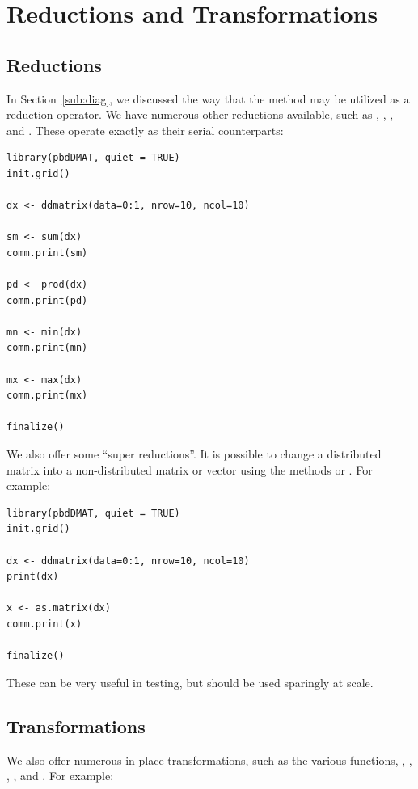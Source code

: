 \section{Reductions and Transformations}

\subsection{Reductions}

In Section~\ref{sub:diag}, we discussed the way that the  method may be utilized as a reduction operator.  We have numerous other reductions available, such as , , , and .  These operate exactly as their serial counterparts:
\begin{lstlisting}[language=rr,title=Reductions]
library(pbdDMAT, quiet = TRUE)
init.grid()

dx <- ddmatrix(data=0:1, nrow=10, ncol=10)

sm <- sum(dx)
comm.print(sm)

pd <- prod(dx)
comm.print(pd)

mn <- min(dx)
comm.print(mn)

mx <- max(dx)
comm.print(mx)

finalize()
\end{lstlisting}

We also offer some ``super reductions''.  It is possible to change a distributed matrix into a non-distributed matrix or vector using the methods  or .  For example:

\begin{lstlisting}[language=rr,title=Super Reductions]
library(pbdDMAT, quiet = TRUE)
init.grid()

dx <- ddmatrix(data=0:1, nrow=10, ncol=10)
print(dx)

x <- as.matrix(dx)
comm.print(x)

finalize()
\end{lstlisting}

These can be very useful in testing, but should be used sparingly at scale.




\subsection{Transformations}

We also offer numerous in-place transformations, such as the various  functions, , , , , and .  For example:

